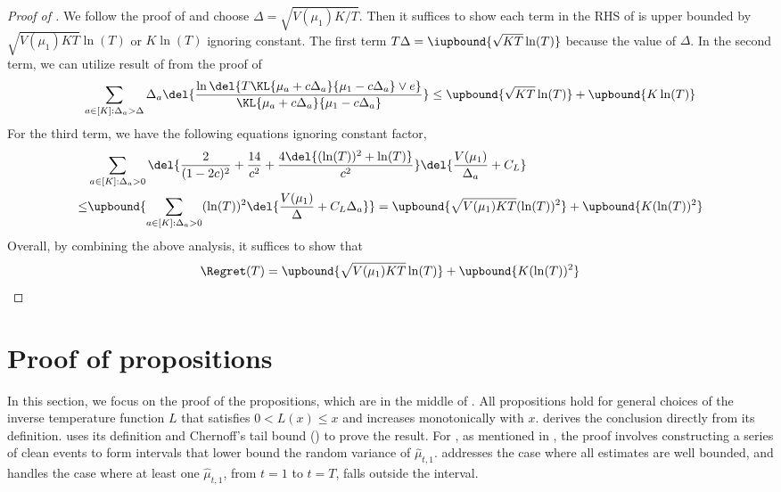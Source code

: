 \identityadaptive*

\begin{proof}[Proof of ]
    We follow the proof of  and choose $\Delta = \sqrt{V(\mu_1)K/T}$. Then it suffices to show each term in the RHS of  is upper bounded by $\sqrt{V(\mu_1)KT} \ln(T)$ or $K\ln(T)$ ignoring constant.
    The first term $T \Delta = \iupbound{\sqrt{KT}\ln(T)}$ because the value of $\Delta$.
    In the second term, we can utilize result of  from the proof of 
    \begin{align*}
        \sum_{a\in[K]: \Delta_a > \Delta} \Delta_a \del{\frac{\ln\del{T\KL{\mu_a+c\Delta_a}{\mu_1-c\Delta_a} \vee e}}{\KL{\mu_a+c\Delta_a}{\mu_1-c\Delta_a}}}
        \leq
        \upbound{ \sqrt{KT }\ln(T)} + \upbound{K\ln(T)}
    \end{align*}
    For the third term, we have the following equations ignoring constant factor,
    \begin{align*}
        & \sum_{a\in[K]: \Delta_a > 0} \del{\frac{2}{(1-2c)^2} + \frac{14}{c^2} + \frac{4\del{(\ln(T))^2+\ln(T)}}{c^2}}  \del{ \frac{V(\mu_1)}{\Delta_a} + C_L }
        \\
        \leq&
        \upbound{ \sum_{a\in[K]: \Delta_a > 0} (\ln(T))^2\del{ \frac{V(\mu_1)}{\Delta} + C_L \Delta_a } }
        =
        \upbound{ \sqrt{V(\mu_1)KT}(\ln(T))^2 } + \upbound{ K (\ln(T))^2 }
    \end{align*}
    Overall, by combining the above analysis, it suffices to show that
    \[
        \Regret(T) = \upbound{\sqrt{V(\mu_1)KT}\ln(T)} + \upbound{K (\ln(T))^2 }
    \]
\end{proof}


\section{Proof of propositions} 
\label{sec:proof-of-propositions}
In this section, we focus on the proof of the propositions, which are in the middle of . All propositions hold for general choices of the inverse temperature function $L$ that satisfies $0 < L(x) \leq x$ and increases monotonically with $x$. 
 derives the conclusion directly from its definition. 
 uses its definition and Chernoff's tail bound () to prove the result. 
For , as mentioned in , the proof involves constructing a series of clean events to form intervals that lower bound the random variance of $\hat{\mu}_{t, 1}$. 
 addresses the case where all estimates are well bounded, and  handles the case where at least one $\hat{\mu}_{t, 1}$, from $t = 1$ to $t = T$, falls outside the interval.

